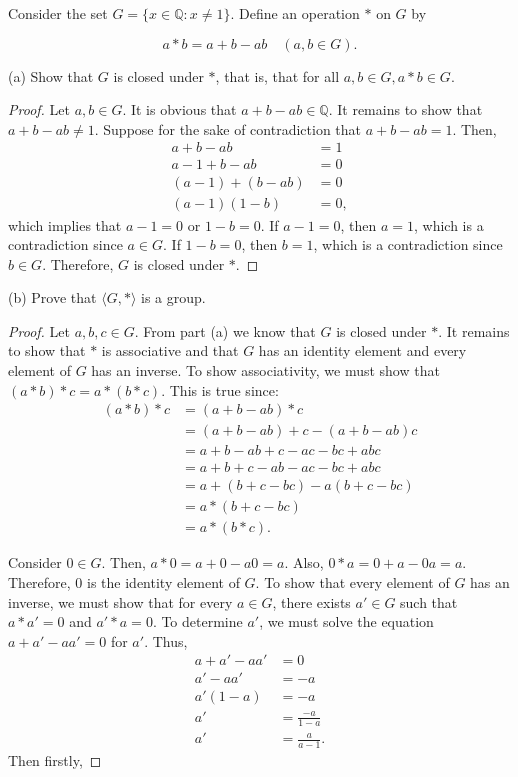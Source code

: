 \documentclass[12pt]{article}
\newenvironment{problem}[2][Problem]{\begin{trivlist}
\item[\hskip \labelsep {\bfseries #1}\hskip \labelsep {\bfseries #2.}]}{\end{trivlist}}
\begin{document}
\begin{problem}{2}
	Consider the set $G=\{x \in \mathbb{Q}: x \neq 1\}$. Define an operation $*$ on $G$ by

$$
a * b=a+b-a b \quad(a, b \in G) .
$$

(a) Show that $G$ is closed under $*$, that is, that for all $a, b \in G, a * b \in G$.
\begin{proof}
	Let $a,b \in G$. It is obvious that $a+b-ab \in \mathbb{Q}$. It remains to show that $a+b-ab \neq 1$. Suppose for the sake of contradiction that $a+b-ab = 1$.
	Then,
	$$
	\begin{aligned}
		a+b-ab &= 1 \\
		a-1+b-ab &= 0 \\
		(a-1)+(b-ab) &= 0 \\
		(a-1)(1-b) &= 0,
	\end{aligned}
	$$
	which implies that $a-1=0$ or $1-b=0$. If $a-1=0$, then $a=1$, which is a contradiction since $a \in G$. If $1-b=0$, then $b=1$, which is a contradiction since $b \in G$.
	Therefore, $G$ is closed under $*$.
\end{proof}

(b) Prove that $\langle G, *\rangle$ is a group.
\begin{proof}
	Let $a,b,c \in G$.
	From part (a) we know that $G$ is closed under $*$. It remains to show that $*$ is
	associative and that $G$ has an identity element and every element of 
	$G$ has an inverse. To show associativity, we must show that $(a * b) * c = a * (b * c)$. 
	This is true since:
	$$
	\begin{aligned}
		(a * b) * c &= (a+b-ab) * c \\
		&= (a+b-ab)+c-(a+b-ab)c \\
		&= a+b-ab+c-ac-bc+abc \\
		&= a+b+c-ab-ac-bc+abc \\
		&= a+(b+c-bc)-a(b+c-bc) \\
		&= a * (b+c-bc) \\
		&= a * (b * c).
	\end{aligned}
	$$

	Consider $0\in{G}$. Then, $a * 0 = a+0-a0 = a$. Also, $0 * a = 0+a-0a = a$. Therefore, $0$ is the identity element of $G$.
	To show that every element of $G$ has an inverse, we must show that for every $a \in G$,
	there exists $a' \in G$ such that $a * a' = 0$ and $a' * a = 0$.
	To determine $a'$, we must solve the equation $a+a'-aa'=0$ for $a'$. Thus, 
	$$
	\begin{aligned}
		a+a'-aa' &= 0 \\
		a'-aa' &= -a \\
		a'(1-a) &= -a \\
		a' &= \frac{-a}{1-a} \\
		a' &= \frac{a}{a-1}.
	\end{aligned}
	$$
	Then firstly, 


\end{proof}
\end{problem}
\end{document}
